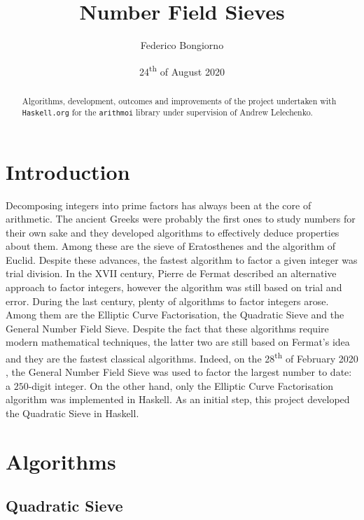 \documentclass{amsart}
\theoremstyle{definition}
\theoremstyle{remark}
\numberwithin{equation}{section}
\begin{document}
\title{Number Field Sieves}

\author{Federico Bongiorno}

\date{24\textsuperscript{th} of August 2020}

\begin{abstract}
Algorithms, development, outcomes and improvements of the project undertaken with \texttt{Haskell.org} for the \texttt{arithmoi} library under supervision of Andrew Lelechenko.
\end{abstract}

\maketitle

\section*{Introduction}

Decomposing integers into prime factors has always been at the core of arithmetic. The ancient Greeks were probably the first ones to study numbers for their own sake and they developed algorithms to effectively deduce properties about
them. Among these are the sieve of Eratosthenes and the algorithm of Euclid. Despite these advances, the fastest algorithm to factor a given integer was trial division. In the XVII century, Pierre de Fermat described an alternative approach to factor integers, however the algorithm was still based on trial and error. During the last century, plenty of algorithms to factor integers arose. Among them
are the Elliptic Curve Factorisation, the Quadratic Sieve and the General Number
Field Sieve. Despite the fact that these algorithms require modern mathematical
techniques, the latter two are still based on Fermat’s idea and they are the fastest classical algorithms. Indeed, on the 28\textsuperscript{th} of February 2020 , the General Number Field Sieve was used to factor the largest number to date: a $250$-digit integer. On the other hand, only the Elliptic Curve Factorisation algorithm was implemented in Haskell. As an initial step, this project developed the Quadratic Sieve in Haskell.

\section{Algorithms}

\subsection*{Quadratic Sieve}
\end{document}
